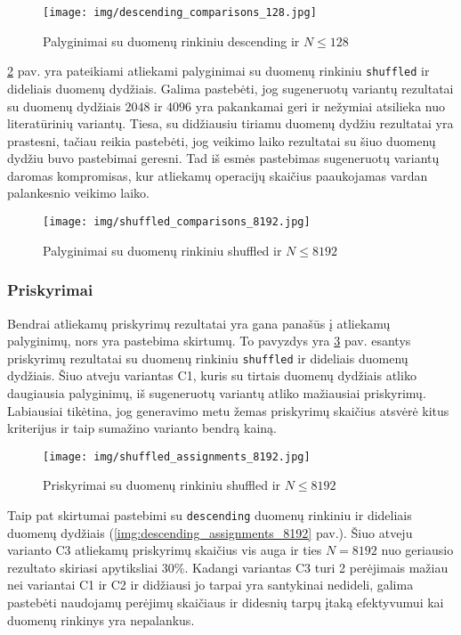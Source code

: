 \documentclass{VUMIFInfBakalaurinis}
\begin{document}
\begin{figure}[H]
  \centering
  \texttt{[image: img/descending\_comparisons\_128.jpg]}
  \caption{Palyginimai su duomenų rinkiniu descending ir $N \leq 128$}
  \label{img:descending_comparisons_128}
\end{figure}

\ref{img:shuffled_comparisons_8192} pav. yra pateikiami atliekami palyginimai su duomenų rinkiniu \verb|shuffled| ir dideliais duomenų dydžiais.
Galima pastebėti, jog sugeneruotų variantų rezultatai su duomenų dydžiais $2048$ ir $4096$ yra pakankamai geri ir nežymiai atsilieka nuo literatūrinių variantų.
Tiesa, su didžiausiu tiriamu duomenų dydžiu rezultatai yra prastesni, tačiau reikia pastebėti, jog veikimo laiko rezultatai su šiuo duomenų dydžiu buvo pastebimai geresni.
Tad iš esmės pastebimas sugeneruotų variantų daromas kompromisas, kur atliekamų operacijų skaičius paaukojamas vardan palankesnio veikimo laiko.

\begin{figure}[H]
  \centering
  \texttt{[image: img/shuffled\_comparisons\_8192.jpg]}
  \caption{Palyginimai su duomenų rinkiniu shuffled ir $N \leq 8192$}
  \label{img:shuffled_comparisons_8192}
\end{figure}

\pagebreak

\subsubsection{Priskyrimai}

Bendrai atliekamų priskyrimų rezultatai yra gana panašūs į atliekamų palyginimų, nors yra pastebima skirtumų.
To pavyzdys yra \ref{img:shuffled_assignments_8192} pav. esantys priskyrimų rezultatai su duomenų rinkiniu \verb|shuffled| ir dideliais duomenų dydžiais.
Šiuo atveju variantas C1, kuris su tirtais duomenų dydžiais atliko daugiausia palyginimų, iš sugeneruotų variantų atliko mažiausiai priskyrimų.
Labiausiai tikėtina, jog generavimo metu žemas priskyrimų skaičius atsvėrė kitus kriterijus ir taip sumažino varianto bendrą kainą.    

\begin{figure}[H]
  \centering
  \texttt{[image: img/shuffled\_assignments\_8192.jpg]}
  \caption{Priskyrimai su duomenų rinkiniu shuffled ir $N \leq 8192$}
  \label{img:shuffled_assignments_8192}
\end{figure}

Taip pat skirtumai pastebimi su \verb|descending| duomenų rinkiniu ir dideliais duomenų dydžiais (\ref{img:descending_assignments_8192} pav.).
Šiuo atveju varianto C3 atliekamų priskyrimų skaičius vis auga ir ties $N = 8192$ nuo geriausio rezultato skiriasi apytiksliai 30\%.
Kadangi variantas C3 turi 2 perėjimais mažiau nei variantai C1 ir C2 ir didžiausi jo tarpai yra santykinai nedideli,
galima pastebėti naudojamų perėjimų skaičiaus ir didesnių tarpų įtaką efektyvumui kai duomenų rinkinys yra nepalankus.
\end{document}
